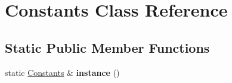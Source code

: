 \hypertarget{classConstants}{\section{Constants Class Reference}
\label{classConstants}
}
\subsection*{Static Public Member Functions}
\begin{DoxyCompactItemize}
\item 
\hypertarget{classConstants_a1a022576d89b01d8706558e277739ca5}{static \hyperlink{classConstants}{Constants} \& {\bfseries instance} ()}\label{classConstants_a1a022576d89b01d8706558e277739ca5}

\end{DoxyCompactItemize}
